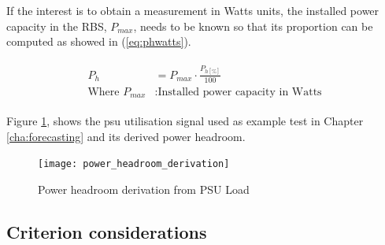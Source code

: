 If the interest is to obtain a measurement in Watts units, the installed power capacity in the RBS, $P_{max}$, needs to be known so that its proportion can be computed as showed in (\ref{eq:phwatts}).

\begin{align}\label{eq:phwatts}
	\begin{split}
		P_h	&= P_{max} \cdot \frac{P_{h[\%]}}{100} \\
		\text{Where } P_{max}	&: \text{Installed power capacity in Watts}
	\end{split}
\end{align}

Figure \ref{fig:ph_der}, shows the \ac{psu} utilisation signal used as example test in Chapter \ref{cha:forecasting} and its derived power headroom.
 	


\begin{figure}[H]
	\centering
	\texttt{[image: power\_headroom\_derivation]}
	\caption{Power headroom derivation from PSU Load}
	\label{fig:ph_der}
\end{figure}



\subsection{Criterion considerations}

